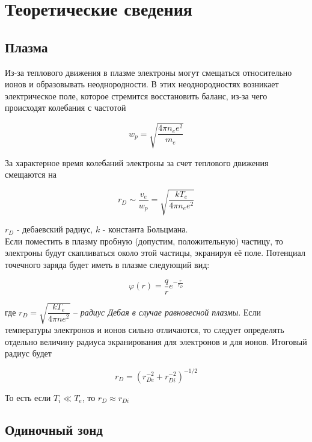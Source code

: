 \documentclass[a4paper,12pt]{article}
\begin{document}
\section{Теоретические сведения}

\subsection*{Плазма}
	
Из-за теплового движения в плазме электроны могут смещаться относительно ионов и образовывать неоднородности. В этих неоднородностях возникает электрическое поле, которое стремится восстановить баланс, из-за чего происходят колебания с частотой

\begin{equation*}
    w_p = \sqrt{\frac{4\pi n_e e^2}{m_e}}
\end{equation*}

За характерное время колебаний электроны за счет теплового движения смещаются на

\begin{equation*}
    r_D \sim \frac{v_e}{w_p} = \sqrt{\frac{kT_e}{4\pi n_e e^2}}    
\end{equation*}

$r_D$ - дебаевский радиус, $k$ - константа Больцмана.\\
Если поместить в плазму пробную (допустим, положительную) частицу, то электроны будут скапливаться около этой частицы, экранируя её поле. Потенциал точечного заряда будет иметь в плазме следующий вид:

\begin{equation*}
    \varphi(r) = \frac{q}{r}e^{-\frac{r}{r_D}}
\end{equation*}

где $r_D = \sqrt{\dfrac{kT_e}{4\pi n e^2}}$ -- \textit{радиус Дебая в случае равновесной плазмы}. Если температуры электронов и ионов сильно отличаются, то следует определять отдельно величину радиуса экранирования для электронов и для ионов. Итоговый радиус будет

\begin{equation*}
    r_D = (r_{De}^{-2} + r_{Di}^{-2})^{-1/2}
\end{equation*}

То есть если $T_i \ll T_e$, то $r_D \approx r_{Di}$ 

\subsection*{Одиночный зонд}
\end{document}
